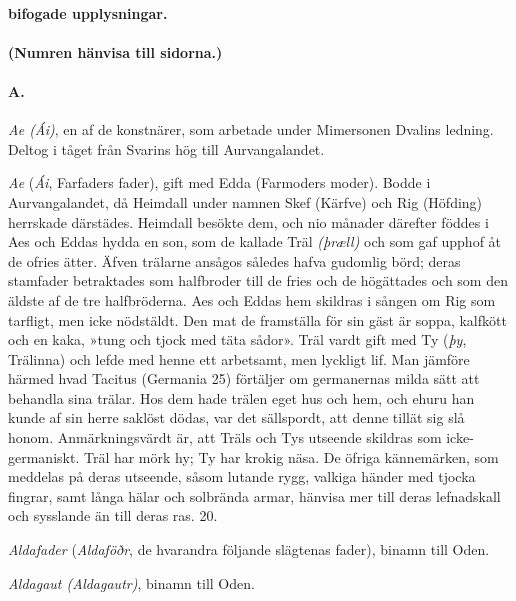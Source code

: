 \paragraph{bifogade upplysningar.}

\paragraph{(Numren hänvisa till sidorna.)}

\paragraph{A.}

\emph{Ae (Ái)}, en af de konstnärer, som arbetade under Mimersonen
Dvalins ledning. Deltog i tåget från Svarins hög till Aurvangalandet.

\emph{Ae} (\emph{Ái}, Farfaders fader), gift med Edda (Farmoders moder).
Bodde i Aurvangalandet, då Heimdall under namnen Skef (Kärfve) och Rig
(Höfding) herrskade därstädes. Heimdall besökte dem, och nio månader
därefter föddes i Aes och Eddas hydda en son, som de kallade Träl
\emph{(þræll)} och som gaf upphof åt de ofries ätter. Äfven trälarne
ansågos således hafva gudomlig börd; deras stamfader betraktades som
halfbroder till de fries och de högättades och som den äldste af de tre
halfbröderna. Aes och Eddas hem skildras i sången om Rig som tarfligt,
men icke nödstäldt. Den mat de framställa för sin gäst är soppa,
kalfkött och en kaka, »tung och tjock med täta sådor». Träl vardt gift
med Ty (\emph{þy}, Trälinna) och lefde med henne ett arbetsamt, men
lyckligt lif. Man jämföre härmed hvad Tacitus (Germania 25) förtäljer om
germanernas milda sätt att behandla sina trälar. Hos dem hade trälen
eget hus och hem, och ehuru han kunde af sin herre saklöst dödas, var
det sällspordt, att denne tillät sig slå honom. Anmärkningsvärdt är, att
Träls och Tys utseende skildras som icke-germaniskt. Träl har mörk hy;
Ty har krokig näsa. De öfriga kännemärken, som meddelas på deras
utseende, såsom lutande rygg, valkiga händer med tjocka fingrar, samt
långa hälar och solbrända armar, hänvisa mer till deras lefnadskall och
sysslande än till deras ras. 20.

\emph{Aldafader} (\emph{Aldaföðr}, de hvarandra följande slägtenas
fader), binamn till Oden.

\emph{Aldagaut (Aldagautr)}, binamn till Oden.

\protect\hypertarget{lb1625905.xhtmlux5cux23start199}{}{}\protect\hypertarget{lb1625905.xhtmlux5cux23start199-a}{}{}\protect\hypertarget{lb1625905.xhtmlux5cux23start199-b}{}{}\protect\hypertarget{lb1625905.xhtmlux5cux23start199-c}{}{}\protect\hypertarget{lb1625905.xhtmlux5cux23start199-d}{}{}

